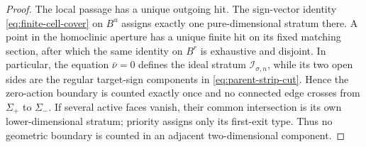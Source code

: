 \documentclass[11pt]{amsart}
\numberwithin{equation}{section}
\theoremstyle{definition}
\theoremstyle{remark}
\begin{document}
\begin{proof}
The local passage has a unique outgoing hit.  The sign-vector identity
\eqref{eq:finite-cell-cover} on $B^u$ assigns exactly one pure-dimensional
stratum there.  A point in the homoclinic aperture has a unique finite hit
on its fixed matching section, after which the same identity on $B^r$ is
exhaustive and disjoint.  In particular, the equation $\bar\nu=0$ defines
the ideal stratum $\mathcal I_{\sigma,n}$, while its two open sides are the
regular target-sign components in \eqref{eq:parent-strip-cut}.  Hence the
zero-action boundary is counted exactly once and no connected edge crosses
from $\Sigma_+$ to
$\Sigma_-$.  If several active faces vanish, their common
intersection is its own lower-dimensional stratum; priority assigns only
its first-exit type.  Thus no geometric boundary is counted in an adjacent
two-dimensional component.


\end{proof}
\end{document}
